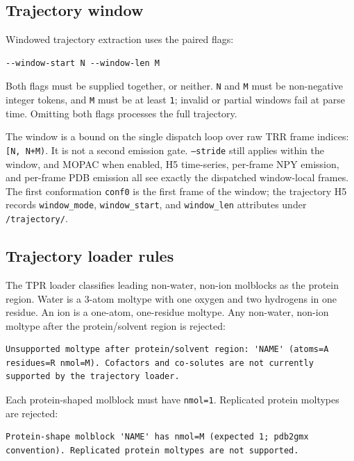 \documentclass[11pt]{article}
\begin{document}
\subsection{Trajectory window}

Windowed trajectory extraction uses the paired flags:

\begin{lstlisting}
--window-start N --window-len M
\end{lstlisting}

Both flags must be supplied together, or neither. \texttt{N} and \texttt{M}
must be non-negative integer tokens, and \texttt{M} must be at least
\texttt{1}; invalid or partial windows fail at parse time. Omitting both
flags processes the full trajectory.

The window is a bound on the single dispatch loop over raw TRR frame indices:
\texttt{[N, N+M)}. It is not a second emission gate. \texttt{--stride} still
applies within the window, and MOPAC when enabled, H5 time-series, per-frame
NPY emission, and per-frame PDB emission all see exactly the dispatched
window-local frames. The first conformation \texttt{conf0} is the first frame
of the window; the trajectory H5 records \texttt{window\_mode},
\texttt{window\_start}, and \texttt{window\_len} attributes under
\texttt{/trajectory/}.

\subsection{Trajectory loader rules}

The TPR loader classifies leading non-water, non-ion molblocks as the protein
region. Water is a 3-atom moltype with one oxygen and two hydrogens in one
residue. An ion is a one-atom, one-residue moltype. Any non-water, non-ion
moltype after the protein/solvent region is rejected:

\begin{lstlisting}
Unsupported moltype after protein/solvent region: 'NAME' (atoms=A residues=R nmol=M). Cofactors and co-solutes are not currently supported by the trajectory loader.
\end{lstlisting}

Each protein-shaped molblock must have \texttt{nmol=1}. Replicated protein
moltypes are rejected:

\begin{lstlisting}
Protein-shape molblock 'NAME' has nmol=M (expected 1; pdb2gmx convention). Replicated protein moltypes are not supported.
\end{lstlisting}
\end{document}
